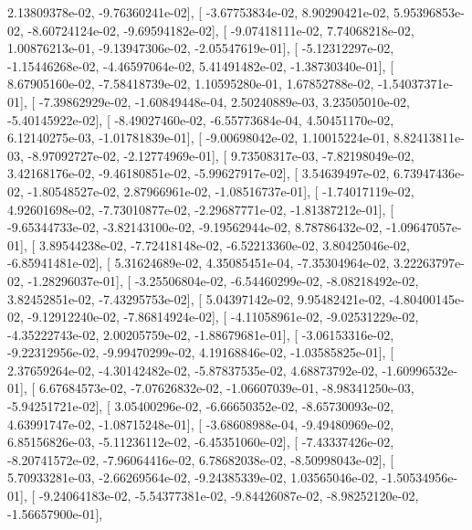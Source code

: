 \documentclass{article}
\begin{document}
          2.13809378e-02,  -9.76360241e-02],
       [ -3.67753834e-02,   8.90290421e-02,   5.95396853e-02,
         -8.60724124e-02,  -9.69594182e-02],
       [ -9.07418111e-02,   7.74068218e-02,   1.00876213e-01,
         -9.13947306e-02,  -2.05547619e-01],
       [ -5.12312297e-02,  -1.15446268e-02,  -4.46597064e-02,
          5.41491482e-02,  -1.38730340e-01],
       [  8.67905160e-02,  -7.58418739e-02,   1.10595280e-01,
          1.67852788e-02,  -1.54037371e-01],
       [ -7.39862929e-02,  -1.60849448e-04,   2.50240889e-03,
          3.23505010e-02,  -5.40145922e-02],
       [ -8.49027460e-02,  -6.55773684e-04,   4.50451170e-02,
          6.12140275e-03,  -1.01781839e-01],
       [ -9.00698042e-02,   1.10015224e-01,   8.82413811e-03,
         -8.97092727e-02,  -2.12774969e-01],
       [  9.73508317e-03,  -7.82198049e-02,   3.42168176e-02,
         -9.46180851e-02,  -5.99627917e-02],
       [  3.54639497e-02,   6.73947436e-02,  -1.80548527e-02,
          2.87966961e-02,  -1.08516737e-01],
       [ -1.74017119e-02,   4.92601698e-02,  -7.73010877e-02,
         -2.29687771e-02,  -1.81387212e-01],
       [ -9.65344733e-02,  -3.82143100e-02,  -9.19562944e-02,
          8.78786432e-02,  -1.09647057e-01],
       [  3.89544238e-02,  -7.72418148e-02,  -6.52213360e-02,
          3.80425046e-02,  -6.85941481e-02],
       [  5.31624689e-02,   4.35085451e-04,  -7.35304964e-02,
          3.22263797e-02,  -1.28296037e-01],
       [ -3.25506804e-02,  -6.54460299e-02,  -8.08218492e-02,
          3.82452851e-02,  -7.43295753e-02],
       [  5.04397142e-02,   9.95482421e-02,  -4.80400145e-02,
         -9.12912240e-02,  -7.86814924e-02],
       [ -4.11058961e-02,  -9.02531229e-02,  -4.35222743e-02,
          2.00205759e-02,  -1.88679681e-01],
       [ -3.06153316e-02,  -9.22312956e-02,  -9.99470299e-02,
          4.19168846e-02,  -1.03585825e-01],
       [  2.37659264e-02,  -4.30142482e-02,  -5.87837535e-02,
          4.68873792e-02,  -1.60996532e-01],
       [  6.67684573e-02,  -7.07626832e-02,  -1.06607039e-01,
         -8.98341250e-03,  -5.94251721e-02],
       [  3.05400296e-02,  -6.66650352e-02,  -8.65730093e-02,
          4.63991747e-02,  -1.08715248e-01],
       [ -3.68608988e-04,  -9.49480969e-02,   6.85156826e-03,
         -5.11236112e-02,  -6.45351060e-02],
       [ -7.43337426e-02,  -8.20741572e-02,  -7.96064416e-02,
          6.78682038e-02,  -8.50998043e-02],
       [  5.70933281e-03,  -2.66269564e-02,  -9.24385339e-02,
          1.03565046e-02,  -1.50534956e-01],
       [ -9.24064183e-02,  -5.54377381e-02,  -9.84426087e-02,
         -8.98252120e-02,  -1.56657900e-01],
\end{document}
